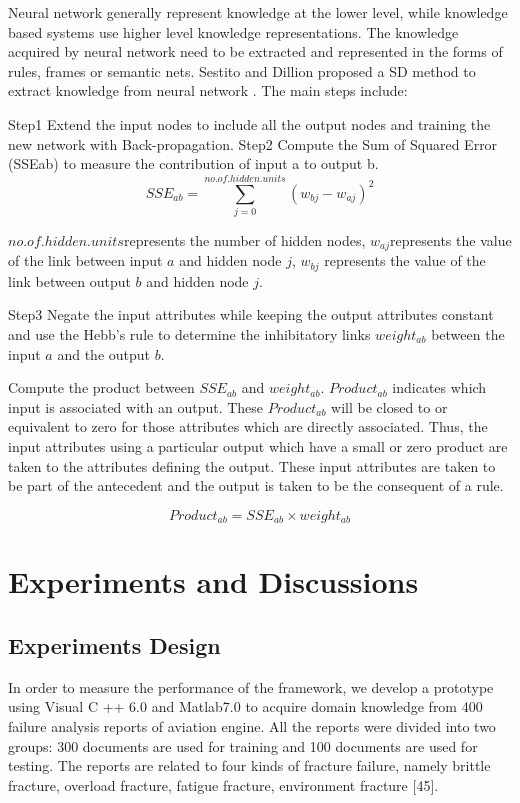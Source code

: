 \documentclass{elsarticle}
\begin{document}
Neural network generally represent knowledge at the lower level, while
knowledge based systems use higher level knowledge
representations. The knowledge acquired by neural network need to be
extracted and represented in the forms of rules, frames or semantic
nets. Sestito and Dillion proposed a SD method to extract knowledge
from neural network \cite{Sestito1991,130346}. The main steps include:

Step1 Extend the input nodes to include all the output nodes and training the new network with Back-propagation.
Step2 Compute the Sum of Squared Error (SSEab) to measure the contribution of input a to output b.
\[SSE_{ab} = \sum_{j=0}^{no.of.hidden.units}{(w_{bj}-w_{aj})}^2\]

$no.of.hidden.units$represents the number of hidden nodes,
$w_{aj}$represents the value of the link between input $a$ and hidden
node $j$, $w_{bj}$ represents the value of the link between output $b$
and hidden node $j$.

Step3 Negate the input attributes while keeping the output attributes
constant and use the Hebb’s rule to determine the inhibitatory links
$weight_{ab}$ between the input $a$ and the output $b$.

Compute the product between $SSE_{ab}$ and
$weight_{ab}$. $Product_{ab}$ indicates which input is associated with
an output. These $Product_{ab}$ will be closed to or equivalent to
zero for those attributes which are directly associated. Thus, the
input attributes using a particular output which have a small or zero
product are taken to the attributes defining the output. These input
attributes are taken to be part of the antecedent and the output is
taken to be the consequent of a rule. 

\[Product_{ab} = SSE_{ab}\times weight_{ab}\]

\section{Experiments and Discussions }
\label{sec:exper-disc-}

\subsection{Experiments Design
}
\label{sec:experiments-design-}

In order to measure the performance of the framework, we develop a
prototype using Visual C ++ 6.0 and Matlab7.0 to acquire domain
knowledge from 400 failure analysis reports of aviation engine. All
the reports were divided into two groups: 300 documents are used for
training and 100 documents are used for testing. The reports are
related to four kinds of fracture failure, namely brittle fracture,
overload fracture, fatigue fracture, environment fracture
[45]\cite{medema}.
\end{document}
